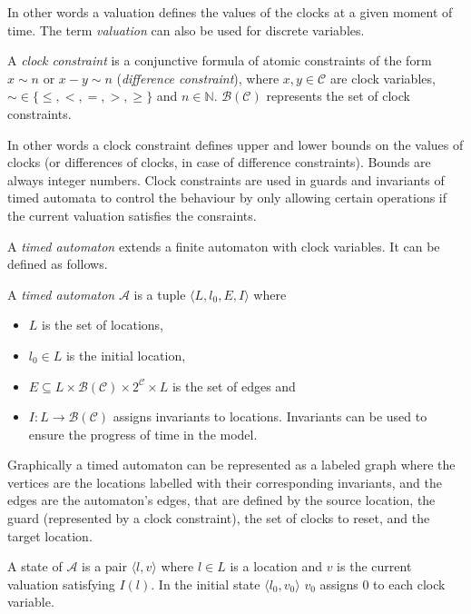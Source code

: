 In other words a valuation defines the values of the clocks at a given moment of time. The term \emph{valuation} can also be used for discrete variables.

\begin{definition}
	A \emph{clock constraint} is a conjunctive formula of atomic
	constraints of the form $x \sim n$ or $x - y \sim n$ (\emph{difference
		constraint}), where $x,y \in \mathcal{C}$ are clock variables, $\sim \in
	\{\leq,<,=,>,\geq\}$ and \hbox{$n \in \mathbb{N}$}. $\mathcal{B}(\mathcal{C})$ represents the set of clock
	constraints.
\end{definition}

In other words a clock constraint defines upper and lower bounds on the values of clocks (or differences of clocks, in case of difference constraints). Bounds are always integer numbers. Clock constraints are used in guards and invariants of timed automata to control the behaviour by only allowing certain operations if the current valuation satisfies the consraints. 

A \emph{timed automaton} extends a finite automaton with clock variables. It can be defined as follows.

\begin{definition}
A \emph{timed automaton} $\mathcal{A}$ is a tuple $\langle L, l_0,
E, I\rangle$ where
\begin{itemize}
	\item $L$ is the set of locations,
	\item $l_0 \in L$ is the initial location,
	\item $E \subseteq L \times \mathcal{B}(\mathcal{C}) \times 2^\mathcal{C} \times L$ is the set of edges and
	\item $I: L \to \mathcal{B}(\mathcal{C})$ assigns invariants to locations.  Invariants can be used to ensure the progress of time in the model. \cite{bengtsson2004timed}
\end{itemize}
\end{definition}

Graphically a timed automaton can be represented as a labeled graph where the vertices are the locations labelled with their corresponding invariants, and the edges are the automaton's edges, that are defined by the source location, the guard (represented by a clock constraint), the set of clocks to reset, and the target location.


A state of $\mathcal{A}$ is a pair $\langle l,v \rangle$ where $l \in L$ is a
location and $v$ is the current valuation satisfying $I(l)$. In the initial
state $\langle l_0,v_0 \rangle$ $v_0$ assigns 0 to each clock variable.

